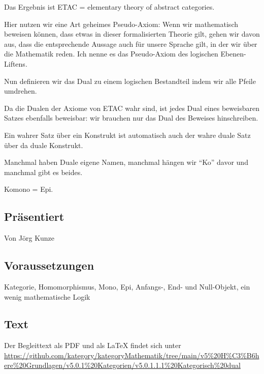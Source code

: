 \documentclass[a4paper]{amsart}
\theoremstyle{definition}
\begin{document}
Das Ergebnis ist ETAC = elementary theory of abstract categories. 

Hier nutzen wir eine Art geheimes Pseudo-Axiom: Wenn wir mathematisch beweisen können, dass etwas in dieser formalisierten Theorie gilt, gehen wir davon aus, dass die entsprechende Aussage auch für unsere Sprache gilt, in der wir über die Mathematik reden. Ich nenne es das Pseudo-Axiom des logischen Ebenen-Liftens.

Nun definieren wir das Dual zu einem logischen Bestandteil indem wir alle Pfeile umdrehen.

Da die Dualen der Axiome von ETAC wahr sind, ist jedes Dual eines beweisbaren Satzes ebenfalls beweisbar: wir brauchen nur das Dual des Beweises hinschreiben.

Ein wahrer Satz über ein Konstrukt ist automatisch auch der wahre duale Satz über da duale Konstrukt.

Manchmal haben Duale eigene Namen, manchmal hängen wir "`Ko"' davor und manchmal gibt es beides.

Komono = Epi.

\subsection*{Präsentiert}
Von Jörg Kunze

\subsection*{Voraussetzungen}
Kategorie, Homomorphismus, Mono, Epi, Anfangs-, End- und Null-Objekt, ein wenig mathematische Logik

\subsection*{Text}
Der Begleittext als PDF und als LaTeX findet sich unter
{\tiny
   \url{https://github.com/kategory/kategoryMathematik/tree/main/v5%20H%C3%B6here%20Grundlagen/v5.0.1%20Kategorien/v5.0.1.1.1%20Kategorisch%20dual}
}
\end{document}
